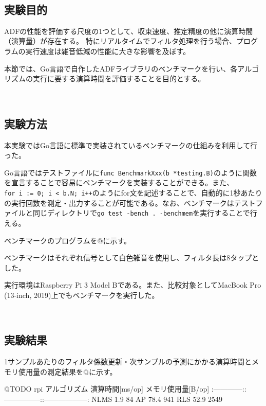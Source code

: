\
\subsection{実験目的}\label{purpose-benchmark}

ADFの性能を評価する尺度の1つとして、収束速度、推定精度の他に演算時間（演算量）が存在する。
特にリアルタイムでフィルタ処理を行う場合、プログラムの実行速度は雑音低減の性能に大きな影響を及ぼす。

本節では、Go言語で自作したADFライブラリのベンチマークを行い、各アルゴリズムの実行に要する演算時間を評価することを目的とする。

\
\subsection{実験方法}\label{instruction-benchmark}

本実験ではGo言語に標準で実装されているベンチマークの仕組みを利用して行った。

Go言語ではテストファイルに\texttt{func\ BenchmarkXxx(b\ *testing.B)}のように関数を宣言することで容易にベンチマークを実装することができる。また、\texttt{for\ i\ :=\ 0;\ i\ \textless{}\ b.N;\ i++}のようにfor文を記述することで、自動的に1秒あたりの実行回数を測定・出力することが可能である。なお、ベンチマークはテストファイルと同じディレクトリで\texttt{go\ test\ -bench\ .\ -benchmem}を実行することで行える。

ベンチマークのプログラムを@に示す。

ベンチマークはそれぞれ信号として白色雑音を使用し、フィルタ長は8タップとした。

実行環境はRaspberry Pi 3 Model Bである。また、比較対象としてMacBook Pro
(13-inch, 2019)上でもベンチマークを実行した。

\
\subsection{実験結果}\label{result-benchmark}

1サンプルあたりのフィルタ係数更新・次サンプルの予測にかかる演算時間とメモリ使用量の測定結果を@に示す。

@TODO rpi \textbar{} アルゴリズム \textbar{} 演算時間{[}ms/op{]}
\textbar{} メモリ使用量{[}B/op{]} \textbar{}
\textbar:------------:\textbar:---------------:\textbar:------------------:\textbar{}
\textbar{} NLMS \textbar{} 1.9 \textbar{} 84 \textbar{} \textbar{} AP
\textbar{} 78.4 \textbar{} 941 \textbar{} \textbar{} RLS \textbar{} 52.9
\textbar{} 2549 \textbar{}

